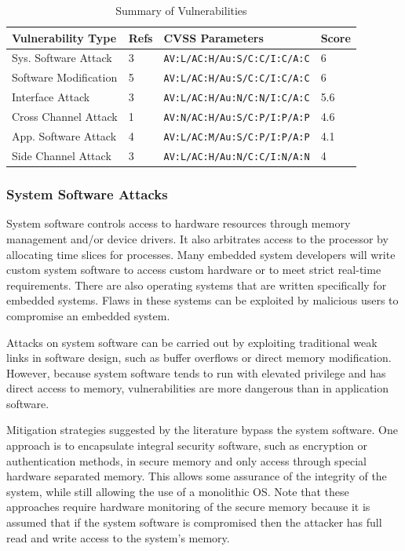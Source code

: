 \documentclass[final,conference,11pt]{IEEEtran}
\begin{document}
\begin{table}[!t]
\renewcommand{\arraystretch}{1.3}
\caption{Summary of Vulnerabilities}
\label{tab:vul_summary}
\tiny
\centering
\begin{tabular}{ | l | l | l | l | }
\hline
 Vulnerability Type & Refs & CVSS Parameters & Score \\ \hline
 Sys. Software Attack	& 3 &	\verb|AV:L/AC:H/Au:S/C:C/I:C/A:C| 	& 6		\\ \hline
 Software Modification	& 5 &	\verb|AV:L/AC:H/Au:S/C:C/I:C/A:C|	& 6		\\ \hline
 Interface Attack		& 3	&	\verb|AV:L/AC:H/Au:N/C:N/I:C/A:C|	& 5.6	\\ \hline
 Cross Channel Attack	& 1 &	\verb|AV:N/AC:H/Au:S/C:P/I:P/A:P|	& 4.6	\\ \hline
 App. Software Attack	& 4 &	\verb|AV:L/AC:M/Au:S/C:P/I:P/A:P|	& 4.1	\\ \hline
 Side Channel Attack		& 3 &	\verb|AV:L/AC:H/Au:N/C:C/I:N/A:N|	& 4		\\ \hline
\end{tabular}
\end{table}

\subsubsection{System Software Attacks}
System software controls access to hardware resources through memory management and/or device drivers.  It also arbitrates access to the processor by allocating time slices for processes.  Many embedded system developers will write custom system software to access custom hardware or to meet strict real-time requirements. There are also operating systems that are written specifically for embedded systems.  Flaws in these systems can be exploited by malicious users to compromise an embedded system.  

Attacks on system software can be carried out by exploiting traditional weak links in software design, such as buffer overflows or direct memory modification.  However, because system software tends to run with elevated privilege and has direct access to memory, vulnerabilities are more dangerous than in application software.  

Mitigation strategies suggested by the literature bypass the system software.  One approach is to encapsulate integral security software, such as encryption or authentication methods, in secure memory and only access through special hardware separated memory.\cite{inveos}  This allows some assurance of the integrity of the system, while still allowing the use of a monolithic OS.  Note that these approaches require hardware monitoring of the secure memory because it is assumed that if the system software is compromised then the attacker has full read and write access to the system's memory.
\end{document}
